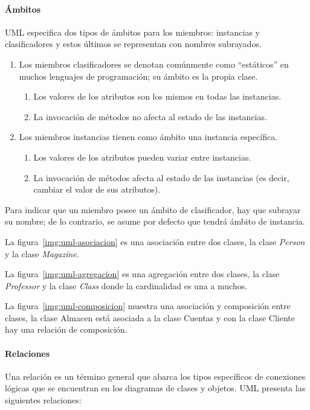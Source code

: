 \paragraph*{Ámbitos}

UML especifica dos tipos de ámbitos para los miembros: instancias y clasificadores y estos últimos se representan con nombres subrayados.

\begin{enumerate}
    \item Los miembros clasificadores se denotan comúnmente como “estáticos” en muchos lenguajes de programación; su ámbito es la propia clase.
    \begin{enumerate}
        \item Los valores de los atributos son los mismos en todas las instancias.
        \item La invocación de métodos no afecta al estado de las instancias.
    \end{enumerate}
    \item Los miembros instancias tienen como ámbito una instancia específica.
\begin{enumerate}
    \item Los valores de los atributos pueden variar entre instancias.
    \item La invocación de métodos afecta al estado de las instancias (es decir, cambiar el valor de sus atributos).
\end{enumerate}
\end{enumerate}
Para indicar que un miembro posee un ámbito de clasificador, hay que subrayar su nombre; de lo contrario, se asume por defecto que tendrá ámbito de instancia.



La figura~\ref{img:uml-asociacion} es una asociación entre dos clases, la clase \textit{Person} y la clase \textit{Magazine}.

La figura~\ref{img:uml-agregacion} es una agregación entre dos clases, la clase \textit{Professor} y la clase \textit{Class} donde la cardinalidad es una a muchos.

La figura~\ref{img:uml-composicion} muestra una  asociación y composición entre clases, la clase Almacen está asociada a la clase Cuentas y con la clase Cliente hay una relación de composición.


\paragraph*{Relaciones}
Una relación es un término general que abarca los tipos específicos de conexiones lógicas que se encuentran en los diagramas de clases y objetos. UML presenta las siguientes relaciones:

